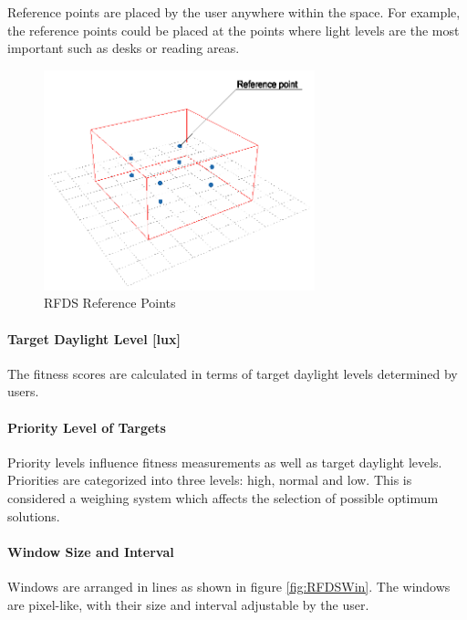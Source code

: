 Reference points are placed by the user anywhere within the space. For example, the reference points could be placed at the points where light levels are the most important such as desks or reading areas.

\begin{figure}[H]
\centering
\includegraphics[width=0.7\textwidth]{./Images/25-RefPoints}
\caption[RFDS Reference Points]{RFDS Reference Points \cite{kawakita08}}
\label{fig:RFDSRefPoints}
\end{figure}

\paragraph{Target Daylight Level [lux]}\mbox{}

The fitness scores are calculated in terms of target daylight levels determined by users.

\paragraph{Priority Level of Targets}\mbox{}

Priority levels influence fitness measurements as well as target daylight levels. Priorities are categorized into three levels: high, normal and low. This is considered a weighing system which affects the selection of possible optimum solutions.

\paragraph{Window Size and Interval}\mbox{}

Windows are arranged in lines as shown in figure \ref{fig:RFDSWin}. The windows are pixel-like, with their size and interval adjustable by the user.

